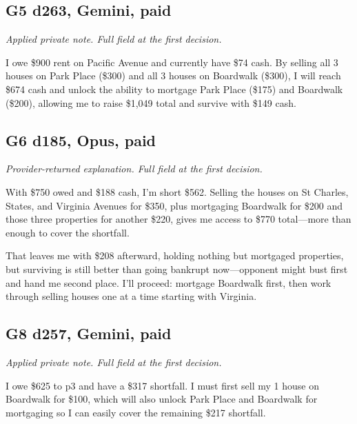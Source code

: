 \subsection*{G5 d263, Gemini, paid}
{\small\textit{Applied private note. Full field at the first decision.}\par I owe \$900 rent on Pacific Avenue and currently have \$74 cash. By selling all 3 houses on Park Place (\$300) and all 3 houses on Boardwalk (\$300), I will reach \$674 cash and unlock the ability to mortgage Park Place (\$175) and Boardwalk (\$200), allowing me to raise \$1,049 total and survive with \$149 cash.\par}

\subsection*{G6 d185, Opus, paid}
{\small\textit{Provider-returned explanation. Full field at the first decision.}\par With \$750 owed and \$188 cash, I'm short \$562. Selling the houses on St Charles, States, and Virginia Avenues for \$350, plus mortgaging Boardwalk for \$200 and those three properties for another \$220, gives me access to \$770 total—more than enough to cover the shortfall.\par 
\par 
That leaves me with \$208 afterward, holding nothing but mortgaged properties, but surviving is still better than going bankrupt now—opponent might bust first and hand me second place. I'll proceed: mortgage Boardwalk first, then work through selling houses one at a time starting with Virginia.\par 
\par 
\par}

\subsection*{G8 d257, Gemini, paid}
{\small\textit{Applied private note. Full field at the first decision.}\par I owe \$625 to p3 and have a \$317 shortfall. I must first sell my 1 house on Boardwalk for \$100, which will also unlock Park Place and Boardwalk for mortgaging so I can easily cover the remaining \$217 shortfall.\par}

